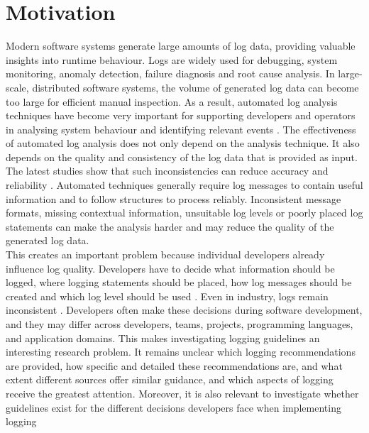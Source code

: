 \section{Motivation}
Modern software systems generate large amounts of log data, providing valuable insights into runtime behaviour.
Logs are widely used for debugging, system monitoring, anomaly detection, failure diagnosis and root cause analysis.
In large-scale, distributed software systems, the volume of generated log data can become too large for efficient manual inspection.
As a result, automated log analysis techniques have become very important for supporting developers and
operators in analysing system behaviour and identifying relevant events \cite{dai2022logram,zhu2019toolsandbenchmarksforautomatedlogparsing}.
The effectiveness of automated log analysis does not only depend on the analysis technique.
It also depends on the quality and consistency of the log data that is provided as input.
The latest studies show that such inconsistencies can reduce accuracy and reliability \cite{khan2022guideliensforassessingtheaccuracy,gholamian2022comprehensivesurveyloggingsoftware,chen2021asurveyofsoftwareloginstrumentation}.
Automated techniques generally require log messages to contain useful information and to follow structures to process reliably.
Inconsistent message formats, missing contextual information, unsuitable log levels or poorly placed log statements can make the analysis harder
and may reduce the quality of the generated log data.
\\
This creates an important problem because individual developers already influence log quality.
Developers have to decide what information should be logged, where logging statements should be placed,
how log messages should be created and which log level should be used \cite{he2021asurveyonautomatedloganalysis,chen2017characterizinganddetectingantipatterns}.
Even in industry, logs remain inconsistent \cite{he2022anempiricalsutdyofloganalysisatmicrosoft}.
Developers often make these decisions during software development, and they may differ across developers, teams, projects, programming languages, and application domains.
This makes investigating logging guidelines an interesting research problem.
It remains unclear which logging recommendations are provided, how specific 
and detailed these recommendations are, and what extent different sources offer similar guidance, 
and which aspects of logging receive the greatest attention.
Moreover, it is also relevant to investigate whether guidelines exist for the different decisions developers face when implementing logging
